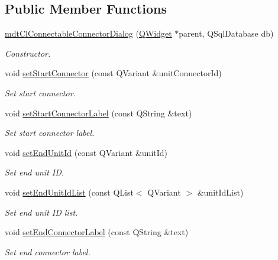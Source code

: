 \subsection*{Public Member Functions}
\begin{DoxyCompactItemize}
\item 
\hyperlink{classmdt_cl_connectable_connector_dialog_a886a38f7bb609e74f7440ccff7738774}{mdt\-Cl\-Connectable\-Connector\-Dialog} (\hyperlink{class_q_widget}{Q\-Widget} $\ast$parent, Q\-Sql\-Database db)
\begin{DoxyCompactList}\small\item\em Constructor. \end{DoxyCompactList}\item 
void \hyperlink{classmdt_cl_connectable_connector_dialog_a61aa76abf546dccfa16f6fc85c098d4d}{set\-Start\-Connector} (const Q\-Variant \&unit\-Connector\-Id)
\begin{DoxyCompactList}\small\item\em Set start connector. \end{DoxyCompactList}\item 
void \hyperlink{classmdt_cl_connectable_connector_dialog_ace67d831f691e17ab37bbf9bf4fa09b3}{set\-Start\-Connector\-Label} (const Q\-String \&text)
\begin{DoxyCompactList}\small\item\em Set start connector label. \end{DoxyCompactList}\item 
void \hyperlink{classmdt_cl_connectable_connector_dialog_a0f2ef9585fab080d76e300bf83a9da7e}{set\-End\-Unit\-Id} (const Q\-Variant \&unit\-Id)
\begin{DoxyCompactList}\small\item\em Set end unit I\-D. \end{DoxyCompactList}\item 
void \hyperlink{classmdt_cl_connectable_connector_dialog_a4761b9554ed57e2a11707067c9835acf}{set\-End\-Unit\-Id\-List} (const Q\-List$<$ Q\-Variant $>$ \&unit\-Id\-List)
\begin{DoxyCompactList}\small\item\em Set end unit I\-D list. \end{DoxyCompactList}\item 
void \hyperlink{classmdt_cl_connectable_connector_dialog_abeae66c11ac520d6f889ec154a4492d5}{set\-End\-Connector\-Label} (const Q\-String \&text)
\begin{DoxyCompactList}\small\item\em Set end connector label. \end{DoxyCompactList}\item 

\end{DoxyCompactItemize}
